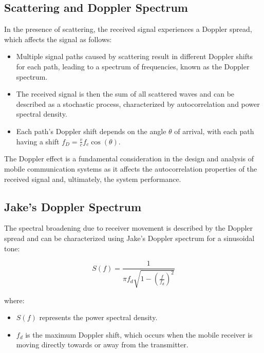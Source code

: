 \subsection*{Scattering and Doppler Spectrum}

In the presence of scattering, the received signal experiences a Doppler spread, which affects the signal as follows:

\begin{itemize}
    \item Multiple signal paths caused by scattering result in different Doppler shifts for each path, leading to a spectrum of frequencies, known as the Doppler spectrum.
    \item The received signal is then the sum of all scattered waves and can be described as a stochastic process, characterized by autocorrelation and power spectral density.
    \item Each path's Doppler shift depends on the angle \( \theta \) of arrival, with each path having a shift \( f_D = \frac{v}{c} f_c \cos(\theta) \).
\end{itemize}

The Doppler effect is a fundamental consideration in the design and analysis of mobile communication systems as it affects the autocorrelation properties of the received signal and, ultimately, the system performance.








\subsection*{Jake's Doppler Spectrum}

The spectral broadening due to receiver movement is described by the Doppler spread and can be characterized using Jake's Doppler spectrum for a sinusoidal tone:

\begin{equation}
    S(f) = \frac{1}{\pi f_d \sqrt{1 - (\frac{f}{f_d})^2}}
\end{equation}

where:
\begin{itemize}
    \item \( S(f) \) represents the power spectral density.
    \item \( f_d \) is the maximum Doppler shift, which occurs when the mobile receiver is moving directly towards or away from the transmitter.
\end{itemize}

